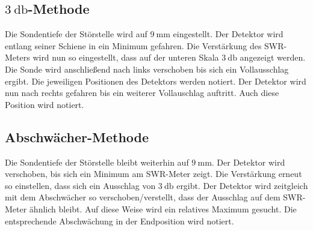 \subsection{$\qty{3}{\decibel}$-Methode}
\label{subsec:3db_methode}

Die Sondentiefe der Störstelle wird auf $\qty{9}{\milli\metre}$ eingestellt. Der Detektor wird entlang seiner Schiene in ein Minimum gefahren. Die Verstärkung des SWR-Meters wird nun so eingestellt, dass auf der unteren Skala
$\qty{3}{\decibel}$ angezeigt werden. Die Sonde wird anschließend nach links verschoben bis sich ein Vollausschlag ergibt. Die jeweiligen Positionen des Detektors werden notiert. Der Detektor
wird nun nach rechts gefahren bis ein weiterer Vollauschlag auftritt. Auch diese Position wird notiert.

\subsection{Abschwächer-Methode}
\label{subsec:abschwächer}
Die Sondentiefe der Störstelle bleibt weiterhin auf $\qty{9}{\milli\metre}$. Der Detektor wird verschoben, bis sich ein Minimum am SWR-Meter zeigt. Die Verstärkung erneut so einstellen, dass sich ein Ausschlag von $\qty{3}{\decibel}$
ergibt. Der Detektor wird zeitgleich mit dem Abschwächer so verschoben/verstellt, dass der Ausschlag auf dem SWR-Meter ähnlich bleibt. Auf diese Weise wird ein relatives Maximum gesucht. Die entsprechende Abschwächung in der Endposition wird
notiert.
